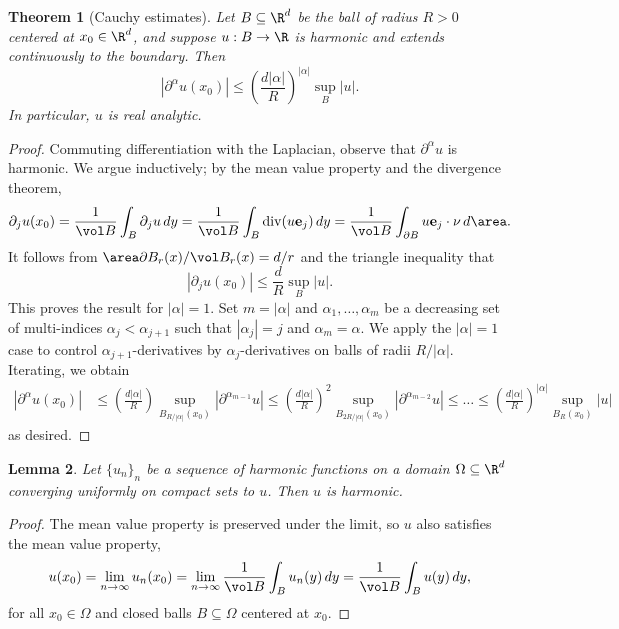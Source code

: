 \documentclass[reqno]{amsart}
\newtheorem{theorem}{Theorem}
\newtheorem{lemma}[theorem]{Lemma}
\theoremstyle{definition}
\theoremstyle{remark}
\let\vec\mathbf
\begin{document}
\begin{theorem}[Cauchy estimates]
	Let $B \subseteq \R^d$ be the ball of radius $R > 0$ centered at $x_0 \in \R^d$, and suppose $u: B \to \R$ is harmonic and extends continuously to the boundary. Then
		\[ | \partial^\alpha u(x_0)| \leq \left( \frac{d |\alpha|}{R}\right)^{|\alpha|} \sup_B |u|. \]
	In particular, $u$ is real analytic. 	
\end{theorem}

\begin{proof}
	Commuting differentiation with the Laplacian, observe that $\partial^\alpha u$ is harmonic. We argue inductively; by the mean value property and the divergence theorem,   
		\[ \partial_j u (x_0) = \frac{1}{\vol B} \int_B \partial_j u  \, dy = \frac{1}{\vol B} \int_B \operatorname{div} (u \vec e_j) \, dy = \frac{1}{\vol B} \int_{\partial B} u \vec e_j \cdot \nu \, d\area. \]	
	It follows from $\area \partial B_r (x)/\vol B_r (x) = d/r$ and the triangle inequality that
		\[ |\partial_j u(x_0)| \leq \frac{d}{R} \sup_B |u| . \]	
	This proves the result for $|\alpha| = 1$. Set $m = |\alpha|$ and $\alpha_1, \dots, \alpha_m$ be a decreasing set of multi-indices $\alpha_{j} < \alpha_{j + 1}$ such that $|\alpha_j| = j$ and $\alpha_m = \alpha$. We apply the $|\alpha| = 1$ case to control $\alpha_{j + 1}$-derivatives by $\alpha_j$-derivatives on balls of radii $R/|\alpha|$. Iterating, we obtain
		\begin{align*}
			|\partial^\alpha u(x_0)|
				&\leq \left(\frac{d |\alpha|}{R} \right) \sup_{B_{R/|\alpha|} (x_0)} |\partial^{\alpha_{m - 1}} u| \leq \left(\frac{d |\alpha|}{R} \right)^2 \sup_{B_{2R/|\alpha|} (x_0)} |\partial^{\alpha_{m - 2}} u| \leq \dots \leq \left(\frac{d |\alpha|}{R} \right)^{|\alpha|} \sup_{B_{R} (x_0)} | u|
		\end{align*}
	as desired. 
\end{proof}

\begin{lemma}
	Let $\{ u_n \}_n$ be a sequence of harmonic functions on a domain $\Omega \subseteq \R^d$ converging uniformly on compact sets to $u$. Then $u$ is harmonic. 
\end{lemma}

\begin{proof}
	The mean value property is preserved under the limit, so $u$ also satisfies the mean value property, 
		\[ u(x_0) = \lim_{n \to \infty} u_n (x_0) = \lim_{n \to \infty} \frac{1}{\vol B} \int_B u_n (y) \, dy =  \frac{1}{\vol B} \int_B u (y) \, dy, \]
	for all $x_0 \in \Omega$ and closed balls $B \subseteq \Omega$ centered at $x_0$. 	
\end{proof}
\end{document}
